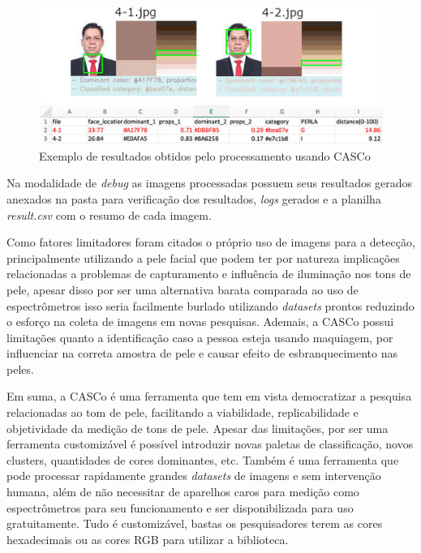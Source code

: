 \begin{figure}[h!]
\caption{Exemplo de resultados obtidos pelo processamento usando CASCo}
\centering

\includegraphics[scale=2]{Template_Latex_TCC-UNIFTEC/_lib/imagens/casco.jpg}

\label{fig:x resultado_CASCo}
\end{figure}

Na modalidade de \textit{debug} as imagens processadas possuem seus resultados gerados anexados na pasta para verificação dos resultados, \textit{logs} gerados e a planilha \textit{result.csv} com o resumo de cada imagem.

Como fatores limitadores foram citados o próprio uso de imagens para a detecção, principalmente utilizando a pele facial que podem ter por natureza implicações relacionadas a problemas de capturamento e influência de iluminação nos tons de pele, apesar disso por ser uma alternativa barata comparada ao uso de espectrômetros isso seria facilmente burlado utilizando \textit{datasets} prontos reduzindo o esforço na coleta de imagens em novas pesquisas. Ademais, a CASCo possui limitações quanto a identificação caso a pessoa esteja usando maquiagem, por influenciar na correta amostra de pele e causar efeito de esbranquecimento nas peles.

Em suma, a CASCo é uma ferramenta que tem em vista democratizar a pesquisa relacionadas ao tom de pele, facilitando a viabilidade, replicabilidade e objetividade da medição de tons de pele. Apesar das limitações, por ser uma ferramenta customizável é possível introduzir novas paletas de classificação, novos clusters, quantidades de cores dominantes, etc. Também é uma ferramenta que pode processar rapidamente grandes \textit{datasets} de imagens e sem intervenção humana, além de não necessitar de aparelhos caros para medição como espectrômetros para seu funcionamento e ser disponibilizada para uso gratuitamente. Tudo é customizável, bastas os pesquisadores terem as cores hexadecimais ou as cores RGB para utilizar a biblioteca.



